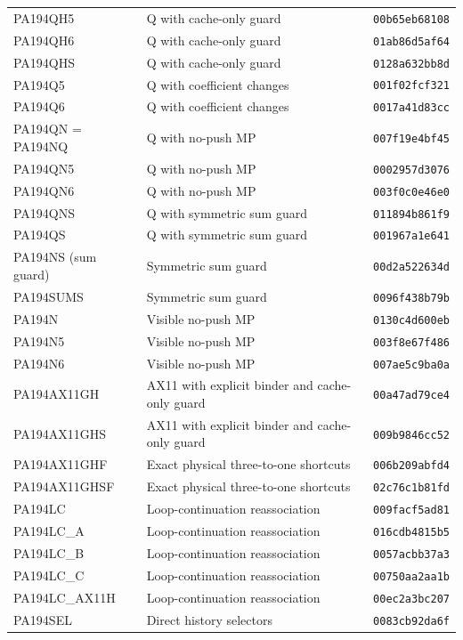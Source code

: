 \begin{longtable}{p{43mm}p{73mm}p{25mm}}
PA194QH5 & Q with cache-only guard & \texttt{00b65eb68108}\\
PA194QH6 & Q with cache-only guard & \texttt{01ab86d5af64}\\
PA194QHS & Q with cache-only guard & \texttt{0128a632bb8d}\\
PA194Q5 & Q with coefficient changes & \texttt{001f02fcf321}\\
PA194Q6 & Q with coefficient changes & \texttt{0017a41d83cc}\\
PA194QN = PA194NQ & Q with no-push MP & \texttt{007f19e4bf45}\\
PA194QN5 & Q with no-push MP & \texttt{0002957d3076}\\
PA194QN6 & Q with no-push MP & \texttt{003f0c0e46e0}\\
PA194QNS & Q with symmetric sum guard & \texttt{011894b861f9}\\
PA194QS & Q with symmetric sum guard & \texttt{001967a1e641}\\
PA194NS (sum guard) & Symmetric sum guard & \texttt{00d2a522634d}\\
PA194SUMS & Symmetric sum guard & \texttt{0096f438b79b}\\
PA194N & Visible no-push MP & \texttt{0130c4d600eb}\\
PA194N5 & Visible no-push MP & \texttt{003f8e67f486}\\
PA194N6 & Visible no-push MP & \texttt{007ae5c9ba0a}\\
PA194AX11GH & AX11 with explicit binder and cache-only guard & \texttt{00a47ad79ce4}\\
PA194AX11GHS & AX11 with explicit binder and cache-only guard & \texttt{009b9846cc52}\\
PA194AX11GHF & Exact physical three-to-one shortcuts & \texttt{006b209abfd4}\\
PA194AX11GHSF & Exact physical three-to-one shortcuts & \texttt{02c76c1b81fd}\\
PA194LC & Loop-continuation reassociation & \texttt{009facf5ad81}\\
PA194LC\_A & Loop-continuation reassociation & \texttt{016cdb4815b5}\\
PA194LC\_B & Loop-continuation reassociation & \texttt{0057acbb37a3}\\
PA194LC\_C & Loop-continuation reassociation & \texttt{00750aa2aa1b}\\
PA194LC\_AX11H & Loop-continuation reassociation & \texttt{00ec2a3bc207}\\
PA194SEL & Direct history selectors & \texttt{0083cb92da6f}\\

\end{longtable}
